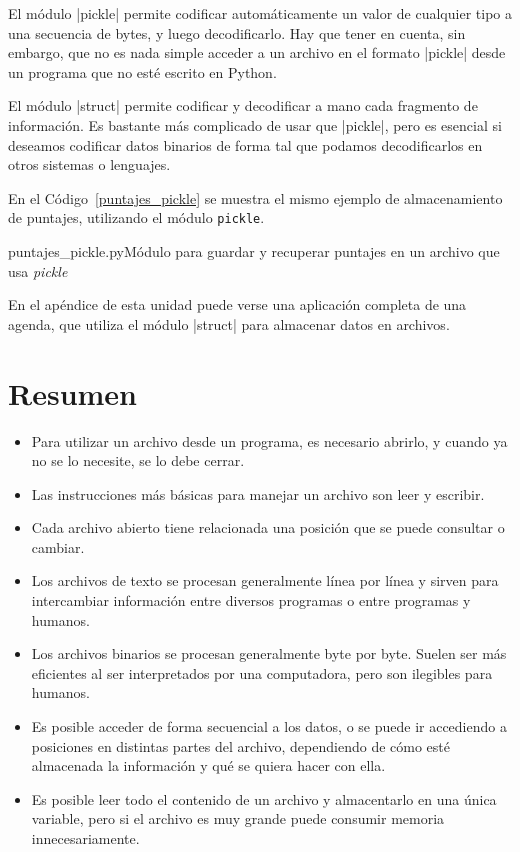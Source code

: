 El módulo |pickle| permite codificar automáticamente un valor de cualquier tipo
a una secuencia de bytes, y luego decodificarlo. Hay que tener en cuenta, sin
embargo, que no es nada simple acceder a un archivo en el formato |pickle|
desde un programa que no esté escrito en Python.

El módulo |struct| permite codificar y decodificar a mano cada fragmento de
información. Es bastante más complicado de usar que |pickle|, pero es esencial
si deseamos codificar datos binarios de forma tal que podamos decodificarlos en
otros sistemas o lenguajes.

En el Código~\ref{puntajes_pickle} se muestra el mismo ejemplo de
almacenamiento de puntajes, utilizando el módulo \lstinline!pickle!.

\begin{codigo}{puntajes\_pickle.py}{Módulo para guardar y recuperar puntajes en
    un archivo que usa \emph{pickle}}
\label{puntajes_pickle}

\end{codigo}

En el apéndice de esta unidad puede verse una aplicación completa de una
agenda, que utiliza el módulo |struct| para almacenar datos en archivos.

\section{Resumen}

\begin{itemize}
\item Para utilizar un archivo desde un programa, es necesario abrirlo, y
cuando ya no se lo necesite, se lo debe cerrar.
\item Las instrucciones más básicas para manejar un archivo son leer y escribir.
\item Cada archivo abierto tiene relacionada una posición que se puede
consultar o cambiar.
\item Los archivos de texto se procesan generalmente línea por línea y
sirven para intercambiar información entre diversos programas o entre
programas y humanos.
\item Los archivos binarios se procesan generalmente byte por byte. Suelen ser
más eficientes al ser interpretados por una computadora, pero son ilegibles
para humanos.
\item Es posible acceder de forma secuencial a los datos, o se puede ir
accediendo a posiciones en distintas partes del archivo, dependiendo de
cómo esté almacenada la información y qué se quiera hacer con ella.
\item Es posible leer todo el contenido de un archivo y almacentarlo en una
única variable, pero si el archivo es muy grande puede consumir memoria
innecesariamente.
\end{itemize}

